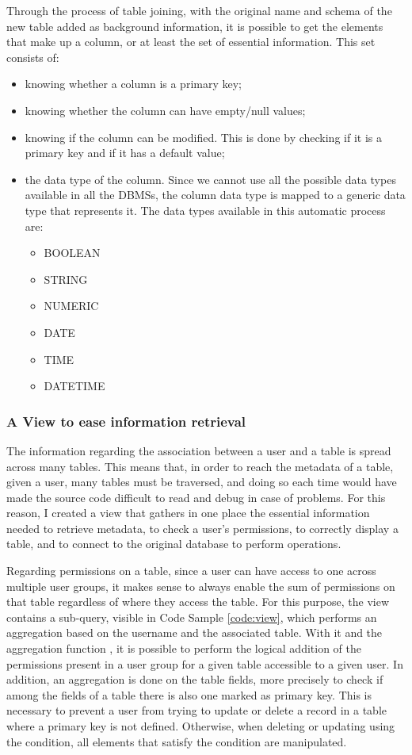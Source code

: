 Through the process of table joining, with the original name and schema of the new table added as background information, it is possible to get the elements that make up a column, or at least the set of essential information. This set consists of:
\begin{itemize}
    \item knowing whether a column is a primary key;
    \item knowing whether the column can have empty/null values;
    \item knowing if the column can be modified. This is done by checking if it is a primary key and if it has a default value;
    \item the data type of the column. Since we cannot use all the possible data types available in all the DBMSs, the column data type is mapped to a generic data type that represents it. The data types available in this automatic process are:
    \begin{itemize}
        \item BOOLEAN
        \item STRING
        \item NUMERIC
        \item DATE
        \item TIME
        \item DATETIME
    \end{itemize}
\end{itemize}

\subsubsection{A View to ease information retrieval}
The information regarding the association between a user and a table is spread across many tables. This means that, in order to reach the metadata of a table, given a user, many tables must be traversed, and doing so each time would have made the source code difficult to read and debug in case of problems. For this reason, I created a view that gathers in one place the essential information needed to retrieve metadata, to check a user's permissions, to correctly display a table, and to connect to the original database to perform operations.

Regarding permissions on a table, since a user can have access to one across multiple user groups, it makes sense to always enable the sum of permissions on that table regardless of where they access the table. For this purpose, the view contains a sub-query, visible in Code Sample \ref{code:view}, which performs an aggregation based on the username and the associated table. With it and the aggregation function , it is possible to perform the logical addition of the permissions present in a user group for a given table accessible to a given user. In addition, an aggregation is done on the table fields, more precisely to check if among the fields of a table there is also one marked as primary key. This is necessary to prevent a user from trying to update or delete a record in a table where a primary key is not defined. Otherwise, when deleting or updating using the  condition, all elements that satisfy the condition are manipulated. 

